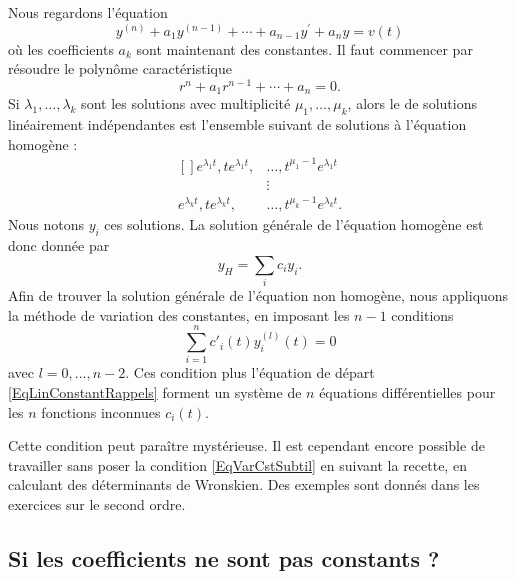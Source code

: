 Nous regardons l'équation
\begin{equation}	\label{EqLinConstantRappels}
	y^{(n)} + a_1 y^{(n-1)} + \cdots + a_{n-1} y^\prime + a_n y = v(t)
\end{equation}
où les coefficients $a_k$ sont maintenant des constantes. Il faut commencer par résoudre le polynôme caractéristique
\begin{equation}
	r^n+a_1 r^{n-1}+\cdots +a_n=0.
\end{equation}
Si $\lambda_1,\ldots,\lambda_k$ sont les solutions avec multiplicité $\mu_1,\ldots,\mu_k$, alors le  de solutions linéairement indépendantes est l'ensemble suivant de solutions à l'équation homogène :
\begin{equation}
	\begin{aligned}[]
		 e^{\lambda_1 t},t e^{\lambda_1 t},	&	\ldots,t^{\mu_1-1} e^{\lambda_1  t}\\
							&\vdots\\
		 e^{\lambda_k t},t e^{\lambda_k t},	&\ldots,t^{\mu_k-1} e^{\lambda_k  t}.
	\end{aligned}
\end{equation}
Nous notons $y_i$ ces solutions. La solution générale de l'équation homogène est donc donnée par
\begin{equation}
	y_H=\sum_i c_i y_i.
\end{equation}
Afin de trouver la solution générale de l'équation non homogène, nous appliquons la méthode de variation des constantes, en imposant les $n-1$ conditions
\begin{equation}		\label{EqVarCstSubtil}
	\sum_{i=1}^n c'_i(t)y_i^{(l)}(t)=0
\end{equation}
avec $l=0,\ldots,n-2$. Ces condition plus l'équation de départ \eqref{EqLinConstantRappels} forment un système de $n$ équations différentielles pour les $n$ fonctions inconnues $c_i(t)$.

Cette condition peut paraître mystérieuse. Il est cependant encore possible de travailler sans poser la condition \eqref{EqVarCstSubtil} en suivant la recette, en calculant des déterminants de Wronskien. Des exemples sont donnés dans les exercices sur le second ordre.

\subsection{Si les coefficients ne sont pas constants ?}


